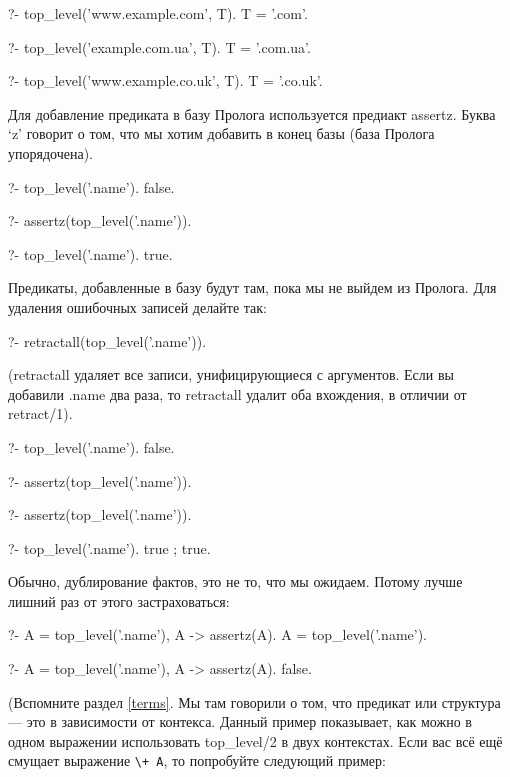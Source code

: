 \documentclass[a4paper]{book}
\begin{document}
\begin{example}{}{}
?- top_level('www.example.com', T).                                         
T = '.com'.

?- top_level('example.com.ua', T).                                          
T = '.com.ua'.

?- top_level('www.example.co.uk', T).                                       
T = '.co.uk'.
\end{example}

Для добавление предиката в базу Пролога используется предиакт
assertz. Буква `z' говорит о том, что мы хотим добавить в конец
базы (база Пролога упорядочена).

\begin{example}{}{}
?- top_level('.name').
false.

?- assertz(top_level('.name')).

?- top_level('.name').
true.
\end{example}

Предикаты, добавленные в базу будут там, пока мы не выйдем из
Пролога. Для удаления ошибочных записей делайте так:

\begin{example}{}{}
?- retractall(top_level('.name')).
\end{example}

(retractall удаляет все записи, унифицирующиеся с
аргументов. Если вы добавили .name два раза, то retractall
удалит оба вхождения, в отличии от retract/1).

\begin{example}{}{}
?- top_level('.name').
false.

?- assertz(top_level('.name')).

?- assertz(top_level('.name')).

?- top_level('.name').
true ;
true.
\end{example}

Обычно, дублирование фактов, это не то, что мы ожидаем.
Потому лучше лишний раз от этого застраховаться:

\begin{example}{}{}
?- A = top_level('.name'), \+ A -> assertz(A).
A = top_level('.name').

?- A = top_level('.name'), \+ A -> assertz(A).
false.
\end{example}

(Вспомните раздел \ref{terms}. Мы там говорили о том, что
предикат или структура --- это в зависимости от контекса. Данный
пример показывает, как можно в одном выражении использовать
top_level/2 в двух контекстах. Если вас всё ещё смущает выражение
\verb|\+ A|, то попробуйте следующий пример:
\end{document}
